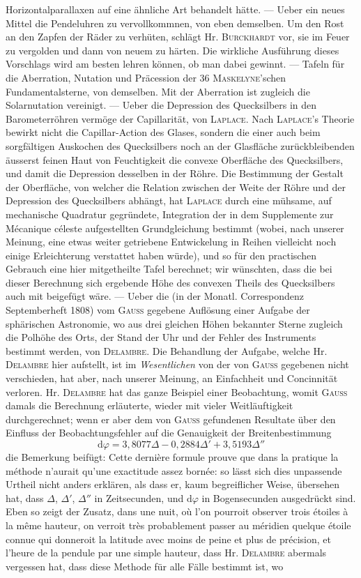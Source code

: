 Horizontalparallaxen auf eine ähnliche Art behandelt hätte. --- Ueber ein neues Mittel die Pendeluhren zu vervollkommnen, von eben demselben. Um den Rost an den Zapfen der Räder zu verhüten, schlägt Hr. \textsc{Burckhardt} vor, sie im Feuer zu vergolden und dann von neuem zu härten. Die wirkliche Ausführung dieses Vorschlags wird am besten lehren können, ob man dabei gewinnt. --- Tafeln für die Aberration, Nutation und Präcession der 36 \textsc{Maskelyne}'schen Fundamentalsterne, von demselben. Mit der Aberration ist zugleich die Solarnutation vereinigt. --- Ueber die Depression des Quecksilbers in den Barometerröhren vermöge der Capillarität, von \textsc{Laplace}. Nach \textsc{Laplace}'s Theorie bewirkt nicht die Capillar-Action des Glases, sondern die einer auch beim sorgfältigen Auskochen des Quecksilbers noch an der Glasfläche zurückbleibenden äusserst feinen Haut von Feuchtigkeit die convexe Oberfläche des Quecksilbers, und damit die Depression desselben in der Röhre. Die Bestimmung der Gestalt der Oberfläche, von welcher die Relation zwischen der Weite der Röhre und der Depression des Quecksilbers abhängt, hat \textsc{Laplace} durch eine mühsame, auf mechanische Quadratur gegründete, Integration der in dem Supplemente zur Mécanique céleste aufgestellten Grundgleichung bestimmt (wobei, nach unserer Meinung, eine etwas weiter getriebene Entwickelung in Reihen vielleicht noch einige Erleichterung verstattet haben würde), und so für den practischen Gebrauch eine hier mitgetheilte Tafel berechnet; wir wünschten, dass die bei dieser Berechnung sich ergebende Höhe des convexen Theils des Quecksilbers auch mit beigefügt wäre. --- Ueber die (in der Monatl. Correspondenz Septemberheft 1808) vom \textsc{Gauss} gegebene Auflösung einer Aufgabe der sphärischen Astronomie, wo aus drei gleichen Höhen bekannter Sterne zugleich die Polhöhe des Orts, der Stand der Uhr und der Fehler des Instruments bestimmt werden, von \textsc{Delambre}. Die Behandlung der Aufgabe, welche Hr. \textsc{Delambre} hier aufstellt, ist im \emph{Wesentlichen} von der von \textsc{Gauss} gegebenen nicht verschieden, hat aber, nach unserer Meinung, an Einfachheit und Concinnität verloren. Hr. \textsc{Delambre} hat das ganze Beispiel einer Beobachtung, womit \textsc{Gauss} damals die Berechnung erläuterte, wieder mit vieler Weitläuftigkeit durchgerechnet; wenn er aber dem von \textsc{Gauss} gefundenen Resultate über den Einfluss der Beobachtungsfehler auf die Genauigkeit der Breitenbestimmung  \[ \mathrm{d}\varphi = 3{,}8077\Delta - 0{,}2884\Delta' + 3{,}5193\Delta'' \] die Bemerkung beifügt: Cette dernière formule prouve que dans la pratique la méthode n'aurait qu'une exactitude assez bornée: so lässt sich dies unpassende Urtheil nicht anders erklären, als dass er, kaum begreiflicher Weise, übersehen hat, dass $\Delta$, $\Delta'$, $\Delta''$ in Zeitsecunden, und $\mathrm{d}\varphi$ in Bogensecunden ausgedrückt sind. Eben so zeigt der Zusatz, dans une nuit, où l'on pourroit observer trois étoiles à la même hauteur, on verroit très probablement passer au méridien quelque étoile connue qui donneroit la latitude avec moins de peine et plus de précision, et l'heure de la pendule par une simple hauteur, dass Hr. \textsc{Delambre} abermals vergessen hat, dass diese Methode für alle Fälle bestimmt ist, wo 